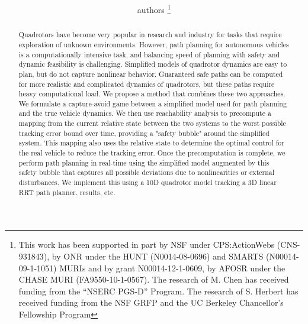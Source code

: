 \documentclass[letterpaper, 10pt, conference]{ieeeconf}      %
\title{\LARGE \bf \MCnote{A Very Good Title}}
\author{authors
\thanks{\color{red}This work has been supported in part by NSF under CPS:ActionWebs (CNS-931843), by ONR under the HUNT (N0014-08-0696) and SMARTS (N00014-09-1-1051) MURIs and by grant N00014-12-1-0609, by AFOSR under the CHASE MURI (FA9550-10-1-0567). The research of M. Chen has received funding from the ``NSERC PGS-D'' Program. The research of S. Herbert has received funding from the NSF GRFP and the UC Berkeley Chancellor's Fellowship Program}
}
\begin{document}
\maketitle
\thispagestyle{empty}
\pagestyle{empty}

\begin{abstract}

Quadrotors have become very popular in research and industry for tasks that require exploration of unknown environments. However, path planning for autonomous vehicles is a computationally intensive task, and balancing speed of planning with safety and dynamic feasibility is challenging. Simplified models of quadrotor dynamics are easy to plan, but do not capture nonlinear behavior. Guaranteed safe paths can be computed for more realistic and complicated dynamics of quadrotors, but these paths require heavy computational load. We propose a method that combines these two approaches. We formulate a capture-avoid game between a simplified model used for path planning and the true vehicle dynamics. We then use reachability analysis to precompute a mapping from the current relative state between the two systems to the worst possible tracking error bound over time, providing a "safety bubble" around the simplified system. This mapping also uses the relative state to determine the optimal control for the real vehicle to reduce the tracking error. Once the precomputation is complete, we perform path planning in real-time using the simplified model augmented by this safety bubble that captures all possible deviations due to nonlinearities or external disturbances. We implement this using a 10D quadrotor model tracking a 3D linear RRT path planner. \color{red} results, etc.
\end{abstract}










\end{document}
